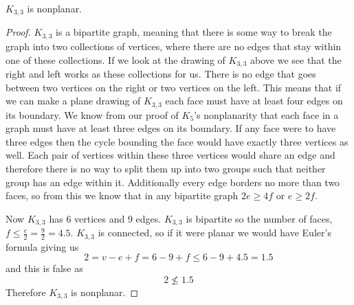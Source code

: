 \documentclass{article}
\begin{document}
\begin{theorem} \label{k3,3}
	$K_{3,3}$ is nonplanar.
\end{theorem}
\begin{center}
		
\end{center}
\begin{proof}
	$K_{3,3}$ is a bipartite graph, meaning that there is some way to break the graph into two collections of vertices, where there are no edges that stay within one of these collections. If we look at the drawing of $K_{3,3}$ above we see that the right and left works as these collections for us. There is no edge that goes between two vertices on the right or two vertices on the left. This means that if we can make a plane drawing of $K_{3,3}$ each face must have at least four edges on its boundary. We know from our proof of $K_5$'s nonplanarity that each face in a graph must have at least three edges on its boundary. If any face were to have three edges then the cycle bounding the face would have exactly three vertices as well. Each pair of vertices within these three vertices would share an edge and therefore there is no way to split them up into two groups such that neither group has an edge within it. Additionally every edge borders no more than two faces, so from this we know that in any bipartite graph $2e \ge 4f$ or $e\ge 2f$.
	
	Now $K_{3,3}$ has 6 vertices and 9 edges. $K_{3,3}$ is bipartite so the number of faces, $f \le \frac e2 = \frac92 = 4.5$. $K_{3,3}$ is connected, so if it were planar we would have Euler's formula giving us $$2=v-e+f=6-9+f\le6-9+4.5=1.5$$ and this is false as $$2\not\le1.5$$ Therefore $K_{3,3}$ is nonplanar.
\end{proof}
\end{document}
